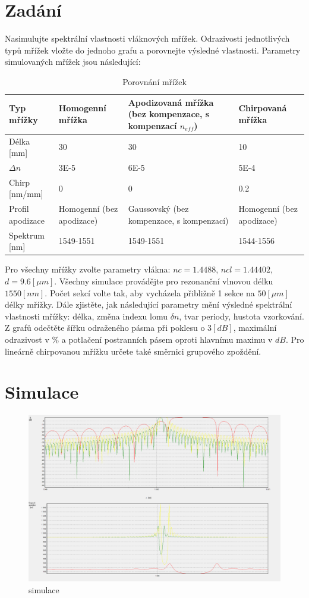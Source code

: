 \section{Zadání}
Nasimulujte spektrální vlastnosti vláknových mřížek. Odrazivosti jednotlivých typů mřížek
vložte do jednoho grafu a porovnejte výsledné vlastnosti. Parametry simulovaných mřížek
jsou následující: 
\begin{table}[h]
    \centering
    \small
    \begin{tabular}{|p{2.5cm}|p{3.9cm}|p{6cm}|p{3.9cm}|}
        \hline
        \textbf{Typ mřížky} & \textbf{Homogenní mřížka} & \textbf{Apodizovaná mřížka (bez kompenzace, s kompenzací $n_{eff}$)} & \textbf{Chirpovaná mřížka} \\ \hline
        Délka [mm] & 30 & 30 & 10 \\ \hline
        $\Delta n$ & 3E-5 & 6E-5 & 5E-4 \\ \hline
        Chirp [nm/mm] & 0 & 0 & 0.2 \\ \hline
        Profil apodizace & Homogenní (bez apodizace) & Gaussovský (bez kompenzace, s kompenzací) & Homogenní (bez apodizace) \\ \hline
        Spektrum [nm] & 1549-1551 & 1549-1551 & 1544-1556 \\ \hline
    \end{tabular}
    \caption{Porovnání mřížek}
    \normalsize
\end{table}

Pro všechny mřížky zvolte parametry vlákna: \(nc = 1.4488\), \(ncl = 1.44402\), \(d = 9.6 [\mu m]\). 
Všechny simulace provádějte pro rezonanční vlnovou délku \(1550 [nm]\). 
Počet sekcí volte tak, aby vycházela přibližně 1 sekce na \(50 [\mu m]\) délky mřížky.
Dále zjistěte, jak následující parametry mění výsledné spektrální vlastnosti mřížky: délka, změna indexu lomu \(\delta n\), tvar periody, hustota vzorkování.
Z grafů odečtěte šířku odraženého pásma při poklesu o \(3 [dB]\), maximální odrazivost v \% a potlačení postranních pásem oproti hlavnímu maximu v \(dB\). 
Pro lineárně chirpovanou mřížku určete také směrnici grupového zpoždění. 

\newpage

\section{Simulace}

\begin{figure}[h!]
    \centering
    \includegraphics[width=\textwidth]{text/img/simulace-1.png}
    \caption{\label{fig:simulace} simulace}
\end{figure}

